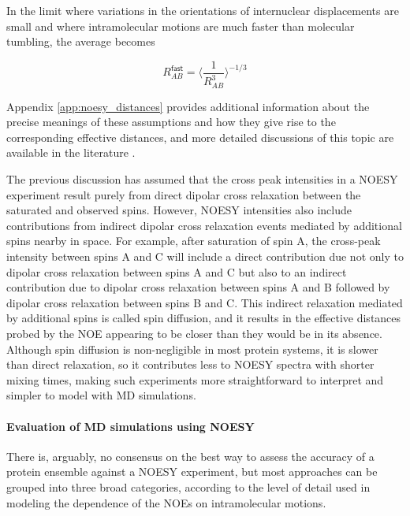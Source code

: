\documentclass[9pt,review]{livecoms}
\begin{document}
\noindent In the limit where variations in the orientations of internuclear displacements are small and where intramolecular motions are much faster than molecular tumbling, the average becomes 

\begin{equation}
\label{eqn:noe_R_fast}
R_{AB}^{\mathsf{fast}} = \langle \frac {1} {R_{AB}^3} \rangle^{-1/3}
\end{equation}

\noindent Appendix \ref{app:noesy_distances} provides additional information about the precise meanings of these assumptions and how they give rise to the corresponding effective distances, and more detailed discussions of this topic are available in the literature \cite{neuhaus_nuclear_2000,vogeli_nuclear_2014}.

The previous discussion has assumed that the cross peak intensities in a NOESY experiment result purely from direct dipolar cross relaxation between the saturated and observed spins.
However, NOESY intensities also include contributions from indirect dipolar cross relaxation events mediated by additional spins nearby in space.
For example, after saturation of spin A, the cross-peak intensity between spins A and C will include a direct contribution due not only to dipolar cross relaxation between spins A and C but also to an indirect contribution due to dipolar cross relaxation between spins A and B followed by dipolar cross relaxation between spins B and C.
This indirect relaxation mediated by additional spins is called spin diffusion, and it results in the effective distances probed by the NOE appearing to be closer than they would be in its absence.
Although spin diffusion is non-negligible in most protein systems, it is slower than direct relaxation, so it contributes less to NOESY spectra with shorter mixing times, making such experiments more straightforward to interpret and simpler to model with MD simulations.

\paragraph{Evaluation of MD simulations using NOESY}

There is, arguably, no consensus on the best way to assess the accuracy of a protein ensemble against a NOESY experiment, but most approaches can be grouped into three broad categories, according to the level of detail used in modeling the dependence of the NOEs on intramolecular motions. 
\end{document}
